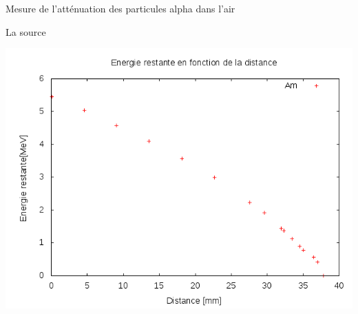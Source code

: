 \documentclass[a4paper,11pt,liststotocnumbered,bibtotocnumbered]{scrartcl}
\begin{document}
\begin{section}{Mesure de l'atténuation des particules alpha dans l'air}
\begin{subsection}{La source }
\begin{minipage}{0.45\textwidth}
     \includegraphics[width=\textwidth]{Sabine/am_distance.png}
    \end{minipage}
   \end{subsection}


\end{section}
\end{document}
